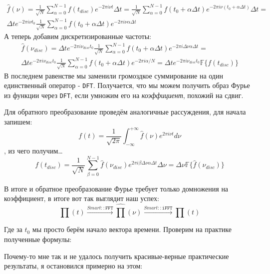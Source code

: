 $$
\begin{aligned}
	\hat{f}(\nu) = \frac{1}{\sqrt{N}}\sum_{\alpha=0}^{N-1}f(t_{disc})e^{-2\pi i \nu t}\Delta t = \frac{1}{\sqrt{N}}\sum_{\alpha=0}^{N-1}f(t_0 + \alpha\Delta t)e^{-2\pi i \nu (t_0 + \alpha\Delta t)}\Delta t = \\
	\Delta t e^{-2\pi i \nu t_0}\frac{1}{\sqrt{N}}\sum_{\alpha=0}^{N-1}f(t_0 + \alpha\Delta t)e^{-2\pi i \nu \alpha\Delta t}
\end{aligned}
$$
А теперь добавим дискретизированные частоты:
$$
\begin{aligned}
	\hat{f}(\nu_{disc}) = \Delta t e^{-2\pi i \nu_{disc} t_0}\frac{1}{\sqrt{N}}\sum_{\alpha=0}^{N-1}f(t_0 + \alpha\Delta t)e^{-2\pi i \Delta\nu \alpha\Delta t} = \\
	\Delta t e^{-2\pi i \nu_{disc} t_0}\frac{1}{\sqrt{N}}\sum_{\alpha=0}^{N-1}f(t_0 + \alpha\Delta t)e^{-2\pi i \alpha / N} = \Delta t e^{-2\pi i \nu_{disc} t_0} \mathbb{F}\{f(t_{disc})\}
\end{aligned}
$$
В последнем равенстве мы заменили громоздкое суммирование на один единственный оператор - \texttt{DFT}. Получается, что мы можем получить образ Фурье из функции через \texttt{DFT}, если умножим его на \textit{коэффициент}, похожий на сдвиг.

Для обратного преобразование проведём аналогичные рассуждения, для начала запишем:
$$
f(t) = \frac{1}{\sqrt{2\pi}}\int_{-\infty}^{+\infty}\hat{f}(\nu)e^{2\pi i \nu t}d\nu
$$, из чего получим\dots
$$
f(t_{disc}) = \frac{1}{\sqrt{N}}\sum_{\beta = 0}^{N-1}\hat{f}(\nu_{disc})e^{2\pi i \beta \Delta\nu \alpha \Delta t}\Delta\nu = \Delta\nu\mathbb{F}\{\hat{f}(\nu_{disc})\}
$$

В итоге и обратное преобразование Фурье требует только домножения на коэффициент, в итоге вот так выглядит наш успех:
$$
\prod(t) \xrightarrow{Smart::\texttt{FFT}} \hat{\prod}(\nu) \xrightarrow{Smart::\texttt{iFFT}} \prod(t)
$$

Где за $t_0$ мы просто берём начало вектора времени. Проверим на практике полученные формулы:

Почему-то мне так и не удалось получить красивые-верные практические результаты, я остановился примерно на этом:

